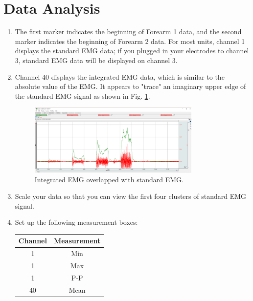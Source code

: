 \documentclass{article}
\begin{document}
\section*{Data Analysis}
\begin{enumerate}
	\item The first marker indicates the beginning of Forearm 1 data, and the second marker indicates the beginning of Forearm 2 data. For most units, channel 1 displays the standard EMG data; if you plugged in your electrodes to channel 3, standard EMG data will be displayed on channel 3.
	\item Channel 40 displays the integrated EMG data, which is similar to the absolute value of the EMG. It appears to "trace" an imaginary upper edge of the standard EMG signal as shown in Fig. \ref{integrated}.
		\begin{figure}[h]
	\includegraphics[width=0.8\textwidth]{../images/EMG_I_15.png}	
		\centering
		\caption{Integrated EMG overlapped with standard EMG.}
		\label{integrated}
		\end{figure}

	\item Scale your data so that you can view the first four clusters of standard EMG signal.
	\item Set up the following measurement boxes:
		\begin{table}[h!]
	\centering
	\label{meas_boxes}
	\begin{tabular}[h!]{cc}
	\toprule
	Channel & Measurement\\
	\midrule
	1 & Min\\
	1 & Max\\
	1 & P-P\\
	40 & Mean\\
	\bottomrule
	\end{tabular}
	\end{table}
	

\end{enumerate}
\end{document}
